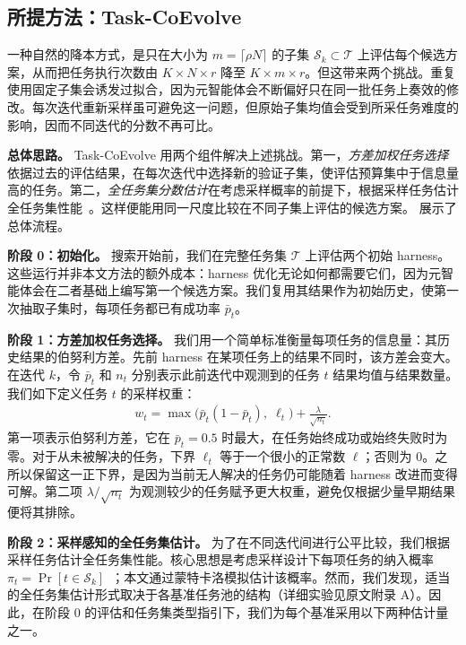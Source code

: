 \documentclass{article}
\begin{document}
\subsection{所提方法：Task-CoEvolve}
\label{subsec:proposed_approach}

一种自然的降本方式，是只在大小为 $m = \lceil \rho N \rceil$ 的子集 $\mathcal{S}_k \subset \mathcal{T}$ 上评估每个候选方案，从而把任务执行次数由 $K \times N \times r$ 降至 $K \times m \times r$。但这带来两个挑战。重复使用固定子集会诱发过拟合，因为元智能体会不断偏好只在同一批任务上奏效的修改。每次迭代重新采样虽可避免这一问题，但原始子集均值会受到所采任务难度的影响，因而不同迭代的分数不再可比。

\textbf{总体思路。}
Task-CoEvolve 用两个组件解决上述挑战。第一，\emph{方差加权任务选择}依据过去的评估结果，在每次迭代中选择新的验证子集，使评估预算集中于信息量高的任务。第二，\emph{全任务集分数估计}在考虑采样概率的前提下，根据采样任务估计全任务集性能~\citep{Horvitz01121952}。这样便能用同一尺度比较在不同子集上评估的候选方案。 展示了总体流程。

\textbf{阶段 0：初始化。}
搜索开始前，我们在完整任务集 $\mathcal{T}$ 上评估两个初始 harness。这些运行并非本文方法的额外成本：harness 优化无论如何都需要它们，因为元智能体会在二者基础上编写第一个候选方案。我们复用其结果作为初始历史，使第一次抽取子集时，每项任务都已有成功率 $\bar{p}_t$。

\textbf{阶段 1：方差加权任务选择。}
我们用一个简单标准衡量每项任务的信息量：其历史结果的伯努利方差。先前 harness 在某项任务上的结果不同时，该方差会变大。在迭代 $k$，令 $\bar{p}_t$ 和 $n_t$ 分别表示此前迭代中观测到的任务 $t$ 结果均值与结果数量。我们如下定义任务 $t$ 的采样权重：
\begin{equation}
\begin{aligned}
w_t = \max\bigl( \bar{p}_t (1 - \bar{p}_t),\; \ell_t \bigr) + \frac{\lambda}{\sqrt{n_t}}.
\end{aligned}
\label{eq:vws_weight}
\end{equation}
第一项表示伯努利方差，它在 $\bar{p}_t=0.5$ 时最大，在任务始终成功或始终失败时为零。对于从未被解决的任务，下界 $\ell_t$ 等于一个很小的正常数 $\ell$；否则为 $0$。之所以保留这一正下界，是因为当前无人解决的任务仍可能随着 harness 改进而变得可解。第二项 $\lambda/\sqrt{n_t}$ 为观测较少的任务赋予更大权重，避免仅根据少量早期结果便将其排除。

\textbf{阶段 2：采样感知的全任务集估计。}
为了在不同迭代间进行公平比较，我们根据采样任务估计全任务集性能。核心思想是考虑采样设计下每项任务的纳入概率 $\pi_t = \Pr[t \in \mathcal{S}_k]$~\citep{Horvitz01121952}；本文通过蒙特卡洛模拟估计该概率。然而，我们发现，适当的全任务集估计形式取决于各基准任务池的结构（详细实验见原文附录 A）。因此，在阶段 0 的评估和任务集类型指引下，我们为每个基准采用以下两种估计量之一。
\end{document}
